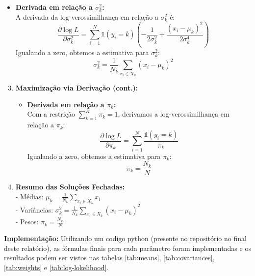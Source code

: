 \begin{enumerate}
\begin{tcolorbox}[colback=white, colframe=black, title=Resposta:]
\begin{enumerate}
\begin{itemize}
            \item \textbf{Derivada em relação a \( \sigma_k^2 \):} \\
            A derivada da log-verossimilhança em relação a \( \sigma_k^2 \) é:
            \[
            \frac{\partial \log L}{\partial \sigma_k^2} = \sum_{i=1}^{N} \mathbb{1}(y_i = k) \left( -\frac{1}{2\sigma_k^2} + \frac{(x_i - \mu_k)^2}{2\sigma_k^4} \right)
            \]
            Igualando a zero, obtemos a estimativa para \( \sigma_k^2 \):
            \[
            \sigma_k^2 = \frac{1}{N_k} \sum_{x_i \in X_k} (x_i - \mu_k)^2
            \]
        \end{itemize}
    \end{enumerate}
\end{tcolorbox}

\begin{tcolorbox}[colback=white, colframe=black, title=Resposta(continuação):]
    
    \begin{enumerate}
        \setcounter{enumii}{2}
        \item \textbf{Maximização via Derivação (cont.):}
        
        \begin{itemize}
            \item \textbf{Derivada em relação a \( \pi_k \):} \\
            Com a restrição \( \sum_{k=1}^{K} \pi_k = 1 \), derivamos a log-verossimilhança em relação a \( \pi_k \):
            \[
            \frac{\partial \log L}{\partial \pi_k} = \sum_{i=1}^{N} \frac{\mathbb{1}(y_i = k)}{\pi_k}
            \]
            Igualando a zero, obtemos a estimativa para \( \pi_k \):
            \[
            \pi_k = \frac{N_k}{N}
            \]
        \end{itemize}

    
        \item \textbf{Resumo das Soluções Fechadas:} \\
        - Médias: \( \mu_k = \frac{1}{N_k} \sum_{x_i \in X_k} x_i \) \\
        - Variâncias: \( \sigma_k^2 = \frac{1}{N_k} \sum_{x_i \in X_k} (x_i - \mu_k)^2 \) \\
        - Pesos: \( \pi_k = \frac{N_k}{N} \)
    
    \end{enumerate}
    

\textbf{Implementação:}
Utilizando um codigo python (presente no repositório no final deste relatório), as fórmulas finais para cada parâmetro foram implementadas e os resultados podem ser vistos nas tabelas \ref{tab:means}, \ref{tab:covariances}, \ref{tab:weights} e \ref{tab:log-lokelihood}.


\end{tcolorbox}
\end{enumerate}
